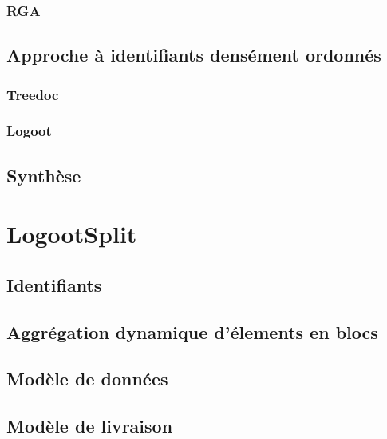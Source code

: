 \subsubsection{\acl{RGA}}


\subsection{Approche à identifiants densément ordonnés}

\subsubsection{Treedoc}


\subsubsection{Logoot}



\subsection{Synthèse}


\section{LogootSplit}


\subsection{Identifiants}


\subsection{Aggrégation dynamique d'élements en blocs}


\subsection{Modèle de données}


\subsection{Modèle de livraison}


